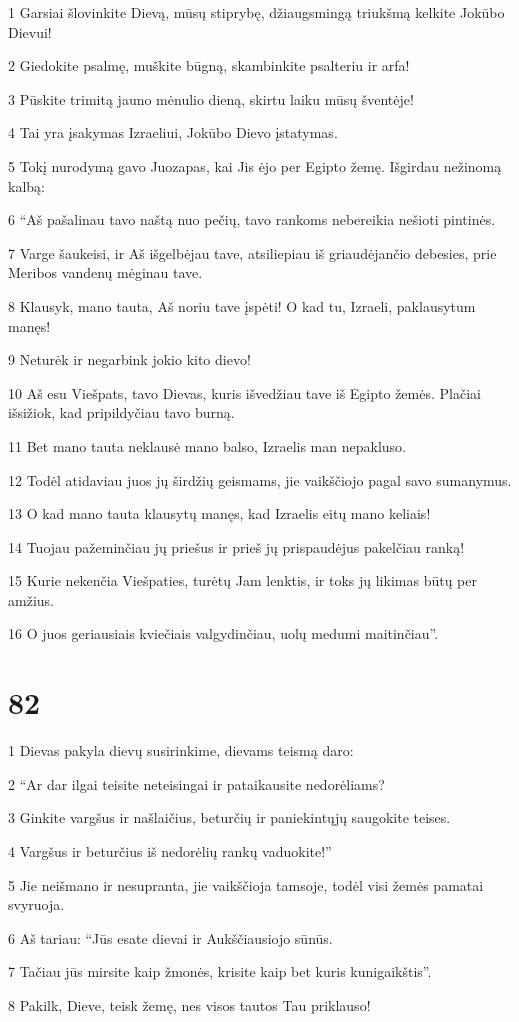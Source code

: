 \par 1 Garsiai šlovinkite Dievą, mūsų stiprybę, džiaugsmingą triukšmą kelkite Jokūbo Dievui! 
\par 2 Giedokite psalmę, muškite būgną, skambinkite psalteriu ir arfa! 
\par 3 Pūskite trimitą jauno mėnulio dieną, skirtu laiku mūsų šventėje! 
\par 4 Tai yra įsakymas Izraeliui, Jokūbo Dievo įstatymas. 
\par 5 Tokį nurodymą gavo Juozapas, kai Jis ėjo per Egipto žemę. Išgirdau nežinomą kalbą: 
\par 6 “Aš pašalinau tavo naštą nuo pečių, tavo rankoms nebereikia nešioti pintinės. 
\par 7 Varge šaukeisi, ir Aš išgelbėjau tave, atsiliepiau iš griaudėjančio debesies, prie Meribos vandenų mėginau tave. 
\par 8 Klausyk, mano tauta, Aš noriu tave įspėti! O kad tu, Izraeli, paklausytum manęs! 
\par 9 Neturėk ir negarbink jokio kito dievo! 
\par 10 Aš esu Viešpats, tavo Dievas, kuris išvedžiau tave iš Egipto žemės. Plačiai išsižiok, kad pripildyčiau tavo burną. 
\par 11 Bet mano tauta neklausė mano balso, Izraelis man nepakluso. 
\par 12 Todėl atidaviau juos jų širdžių geismams, jie vaikščiojo pagal savo sumanymus. 
\par 13 O kad mano tauta klausytų manęs, kad Izraelis eitų mano keliais! 
\par 14 Tuojau pažeminčiau jų priešus ir prieš jų prispaudėjus pakelčiau ranką! 
\par 15 Kurie nekenčia Viešpaties, turėtų Jam lenktis, ir toks jų likimas būtų per amžius. 
\par 16 O juos geriausiais kviečiais valgydinčiau, uolų medumi maitinčiau”.


\chapter{82}


\par 1 Dievas pakyla dievų susirinkime, dievams teismą daro: 
\par 2 “Ar dar ilgai teisite neteisingai ir pataikausite nedorėliams? 
\par 3 Ginkite vargšus ir našlaičius, beturčių ir paniekintųjų saugokite teises. 
\par 4 Vargšus ir beturčius iš nedorėlių rankų vaduokite!” 
\par 5 Jie neišmano ir nesupranta, jie vaikščioja tamsoje, todėl visi žemės pamatai svyruoja. 
\par 6 Aš tariau: “Jūs esate dievai ir Aukščiausiojo sūnūs. 
\par 7 Tačiau jūs mirsite kaip žmonės, krisite kaip bet kuris kunigaikštis”. 
\par 8 Pakilk, Dieve, teisk žemę, nes visos tautos Tau priklauso!


